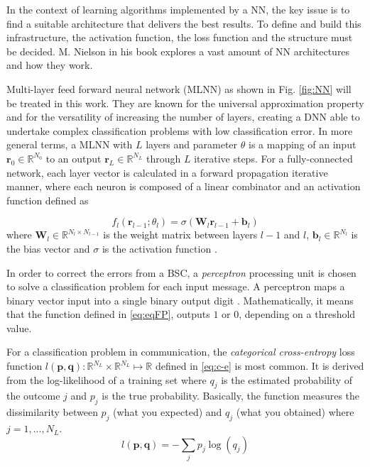 \documentclass[conference]{IEEEtran}
\begin{document}
In the context of learning algorithms implemented by a NN, the key issue is to find a suitable architecture that delivers the best results. To define and build this infrastructure, the activation function, the loss function and the structure must be decided.  M. Nielson \cite{b8} in his book explores a vast amount of NN architectures and how they work. 

Multi-layer feed forward neural network (MLNN) as shown in Fig. \ref{fig:NN} will be treated in this work. They are known for the universal approximation property \cite{b9} and for the versatility of increasing the number of layers, creating a DNN able to undertake complex classification problems with low classification error. In more general terms, a MLNN with $L$ layers and parameter $\theta$ is a mapping of an input $\textbf{r}_0 \in \mathbb{R}^{N_0}$ to an output $\textbf{r}_L \in \mathbb{R}^{N_L}$ through $L$ iterative steps. For a fully-connected network, each layer vector is calculated in a forward propagation iterative manner, where each neuron is composed of a linear combinator and an activation function  defined as 

\begin{equation}\label{eq:eqFP}
	f_{l}\left( \textbf{r}_{l-1};\theta _{l}\right) = \sigma \left( \textbf{W}_{l}\textbf{r}_{l-1}+\textbf{b}_{l}\right)
\end{equation}
where $\textbf{W}_{l}\in \mathbb{R} ^{N_{l}\times N_{l-1}}$ is the weight matrix between layers $l-1$ and $l$,  $\textbf{b}_{l}\in \mathbb{R} ^{N_l}$ is the bias vector and $\sigma$ is the activation function \cite{b2}.

In order to correct the errors from a BSC, a \textit{perceptron} processing unit is chosen to solve a classification problem for each input message. A perceptron maps a binary vector input into a single binary output digit \cite{b8}. Mathematically, it means that the function defined in \eqref{eq:eqFP}, outputs $1$ or $0$, depending on a threshold value.

For a classification problem in communication, the \textit{categorical cross-entropy} loss function $l(\textbf{p},\textbf{q}):\mathbb{R} ^{N_L}\times \mathbb{R} ^{N_L}\mapsto \mathbb{R}$ defined in \eqref{eq:c-e} is most common. It is derived from the log-likelihood of a training set where $q_j$ is the estimated probability of the outcome $j$ and $p_{j}$ is the true probability. Basically, the function measures the dissimilarity between $p_{j}$ (what you expected) and $q_{j}$ (what you obtained) \cite{b10} where $j=1,...,N_L$.
\begin{equation}\label{eq:c-e}
	l(\textbf{p},\textbf{q})=-\sum _{j}p_{j}\log \left( q_{j}\right)
\end{equation}
\end{document}
